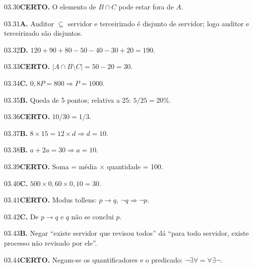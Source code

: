 \begin{solucao}{03.30}\textbf{CERTO.} O elemento de $B\cap C$ pode estar fora de $A$.\end{solucao}
\begin{solucao}{03.31}\textbf{A.} Auditor $\subseteq$ servidor e terceirizado é disjunto de servidor; logo auditor e terceirizado são disjuntos.\end{solucao}
\begin{solucao}{03.32}\textbf{D.} $120+90+80-50-40-30+20=190$.\end{solucao}
\begin{solucao}{03.33}\textbf{CERTO.} $|A\cap B\setminus C|=50-20=30$.\end{solucao}
\begin{solucao}{03.34}\textbf{C.} $0,8P=800\Rightarrow P=1000$.\end{solucao}
\begin{solucao}{03.35}\textbf{B.} Queda de 5 pontos; relativa a 25: $5/25=20\%$.\end{solucao}
\begin{solucao}{03.36}\textbf{CERTO.} $10/30=1/3$.\end{solucao}
\begin{solucao}{03.37}\textbf{B.} $8\times15=12\times d\Rightarrow d=10$.\end{solucao}
\begin{solucao}{03.38}\textbf{B.} $a+2a=30\Rightarrow a=10$.\end{solucao}
\begin{solucao}{03.39}\textbf{CERTO.} Soma = média $\times$ quantidade = 100.\end{solucao}
\begin{solucao}{03.40}\textbf{C.} $500\times0,60\times0,10=30$.\end{solucao}
\begin{solucao}{03.41}\textbf{CERTO.} Modus tollens: $p\to q$, $\neg q\Rightarrow\neg p$.\end{solucao}
\begin{solucao}{03.42}\textbf{C.} De $p\to q$ e $q$ não se conclui $p$.\end{solucao}
\begin{solucao}{03.43}\textbf{B.} Negar ``existe servidor que revisou todos'' dá ``para todo servidor, existe processo não revisado por ele''.\end{solucao}
\begin{solucao}{03.44}\textbf{CERTO.} Negam-se os quantificadores e o predicado: $\neg\exists\forall=\forall\exists\neg$.\end{solucao}
